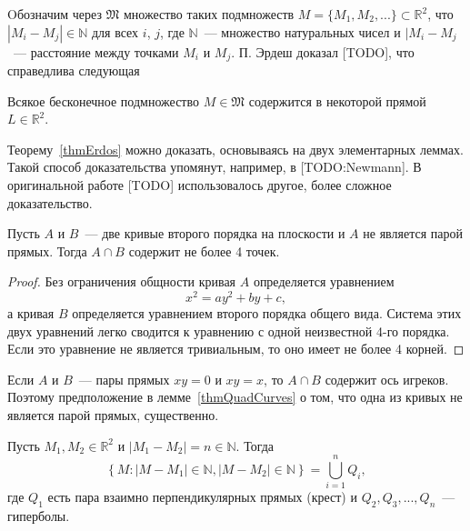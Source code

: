 Oбозначим через $\mathfrak{M}$ множество таких подмножеств
$
	M = \{M_1, M_2, ... \}\subset \mathbb{R}^2
$,
что
$
	|M_i - M_j|\in\mathbb{N}
$
для всех $i$, $j$, где $\mathbb{N}$~--- множество натуральных чисел
и $|M_i - M_j$~--- расстояние между точками $M_i$ и $M_j$.
П. Эрдеш доказал
[TODO],
что справедлива следующая

\begin{theorem}
	\label{thmErdos}
	Всякое бесконечное подмножество $M\in\mathfrak{M}$
	содержится в некоторой прямой $L\in\mathbb{R}^2$.
\end{theorem}

Теорему~\ref{thmErdos} можно доказать, основываясь на двух элементарных леммах.
Такой способ доказательства упомянут, например, в [TODO:Newmann].
В оригинальной работе [TODO] использовалось другое, более сложное доказательство.

\begin{lemma}
	\label{thmQuadCurves}
	Пусть $A$ и $B$~--- две кривые второго порядка на плоскости и $A$ не является парой прямых.
	Тогда $A\cap B$ содержит не более 4 точек.
\end{lemma}

\begin{proof}
	Без ограничения общности кривая $A$ определяется уравнением
	\begin{equation*}
		x^2 = ay^2 + by +c
		,
	\end{equation*}
	а кривая $B$ определяется уравнением второго порядка общего вида.
	Система этих двух уравнений легко сводится к уравнению с одной неизвестной 4-го порядка.
	Если это уравнение не является тривиальным, то оно имеет не более 4 корней.
\end{proof}

Если $A$ и $B$~--- пары прямых $xy=0$ и $xy=x$,
то $A\cap B$ содержит ось игреков.
Поэтому предположение в лемме~\ref{thmQuadCurves} о том,
что одна из кривых не является парой прямых, существенно.

\begin{lemma}
	\label{thm:quadCurveFamily}
	Пусть $M_1, M_2 \in \mathbb{R}^2$ и
	$|M_1 - M_2| = n \in \mathbb{N}$.
	Тогда
	\begin{equation}
		\label{eq:quadCurveFamily}
		\left\{
			M: |M-M_1|\in\mathbb{N}, |M-M_2|\in\mathbb{N}
		\right\}
		=\bigcup_{i=1}^n Q_i
		,
	\end{equation}
	где $Q_1$ есть пара взаимно перпендикулярных прямых (крест)
	и $Q_2, Q_3,...,Q_n$~--- гиперболы.
\end{lemma}

